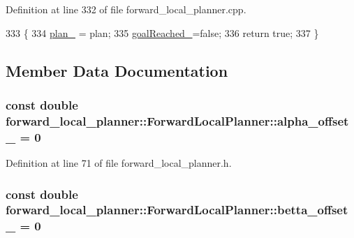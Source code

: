 Definition at line 332 of file forward\+\_\+local\+\_\+planner.\+cpp.


\begin{DoxyCode}
333 \{
334     \hyperlink{classforward__local__planner_1_1ForwardLocalPlanner_a64a6d7c51bafd57b02b9d098ac24dd45}{plan\_} = plan;
335     \hyperlink{classforward__local__planner_1_1ForwardLocalPlanner_a2041c1e8216fd7b6e9e00489fc463d4c}{goalReached\_}=\textcolor{keyword}{false};
336     \textcolor{keywordflow}{return} \textcolor{keyword}{true};
337 \}
\end{DoxyCode}


\subsection{Member Data Documentation}
\subsubsection[{\texorpdfstring{alpha\+\_\+offset\+\_\+}{alpha_offset_}}]{\setlength{\rightskip}{0pt plus 5cm}const double forward\+\_\+local\+\_\+planner\+::\+Forward\+Local\+Planner\+::alpha\+\_\+offset\+\_\+ = 0\hspace{0.3cm}{\ttfamily [private]}}\hypertarget{classforward__local__planner_1_1ForwardLocalPlanner_adafa209756b07476ae13564da2d9b292}{}\label{classforward__local__planner_1_1ForwardLocalPlanner_adafa209756b07476ae13564da2d9b292}


Definition at line 71 of file forward\+\_\+local\+\_\+planner.\+h.

\subsubsection[{\texorpdfstring{betta\+\_\+offset\+\_\+}{betta_offset_}}]{\setlength{\rightskip}{0pt plus 5cm}const double forward\+\_\+local\+\_\+planner\+::\+Forward\+Local\+Planner\+::betta\+\_\+offset\+\_\+ = 0\hspace{0.3cm}{\ttfamily [private]}}\hypertarget{classforward__local__planner_1_1ForwardLocalPlanner_ac6ccaa5481ffd084621a4f47933c1ad7}{}\label{classforward__local__planner_1_1ForwardLocalPlanner_ac6ccaa5481ffd084621a4f47933c1ad7}


